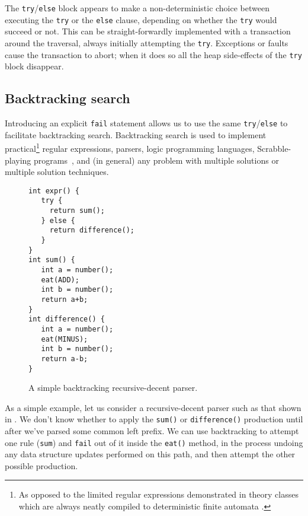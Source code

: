 The {\tt try}/{\tt else} block appears to make a non-deterministic
choice between executing the {\tt try} or the {\tt else} clause,
depending on whether the {\tt try} would succeed or not.
This can be straight-forwardly implemented
with a transaction around the traversal,
always initially attempting
the {\tt try}.  Exceptions or faults cause the transaction to abort;
when it does so all the
heap side-effects of the {\tt try} block disappear.

\subsection{Backtracking search}\label{sec:backtrack}
Introducing an explicit {\tt fail} statement allows us to use the same
{\tt try}/{\tt else} to facilitate backtracking
search. Backtracking search is used to implement
practical\footnote{As opposed to the limited regular expressions
demonstrated in theory classes which are always neatly compiled to
deterministic finite automata \cite{Friedl02}.} regular expressions,
parsers, logic programming languages, Scrabble-playing
programs~\cite{AppelJa88}, and (in general) any problem with multiple
solutions or multiple solution techniques.

\begin{figure}\sis\fontsize{9}{10}\begin{verbatim}
int expr() {
   try {
     return sum();
   } else {
     return difference();
   }
}
int sum() {
   int a = number();
   eat(ADD);
   int b = number();
   return a+b;
}
int difference() {
   int a = number();
   eat(MINUS);
   int b = number();
   return a-b;
}
\end{verbatim}
\caption{A simple backtracking recursive-decent parser.}
\label{fig:backtrack-parser}
\end{figure}

As a simple example, let us consider a recursive-decent parser such as
that shown in .  We don't know whether to
apply the \texttt{sum()} or \texttt{difference()} production until
after we've parsed some common left prefix.  We can use backtracking
to attempt one rule (\texttt{sum}) and \texttt{fail} out of it
inside the \texttt{eat()} method, in the process undoing any data
structure updates performed on this path, and then attempt the other
possible production.

